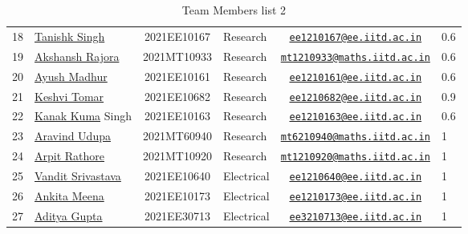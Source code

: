 \documentclass[table]{rapportCS}
\begin{document}
\begin{table}[h]\label{sec:ourtribetwo}
\centering
  \caption{Team Members list 2}
  \begin{tabular}{|p{.3cm}|p{2.9cm}|c|p{2cm}|c|p{.3cm}|}
  \hline
18 & \href{https://www.linkedin.com/in/tanishk-singh-80ba09224/}{Tanishk Singh} & 2021EE10167 & Research & \href{mailto:ee1210167@ee.iitd.ac.in}{\nolinkurl{ee1210167@ee.iitd.ac.in}} & 0.6 \\
        19 & \href{https://www.linkedin.com/in/akshansh-rajora-5794b5228}{Akshansh Rajora} & 2021MT10933 & Research & \href{mailto:mt1210933@maths.iitd.ac.in}{\nolinkurl{mt1210933@maths.iitd.ac.in}} & 0.6 \\
        20 & \href{https://www.linkedin.com/in/ayush-madhur-40a575236/}{ Ayush Madhur}& 2021EE10161 & Research & \href{mailto:ee1210161@ee.iitd.ac.in}{\nolinkurl{ee1210161@ee.iitd.ac.in}} & 0.6 \\
        21 &\href{https://www.linkedin.com/in/keshvi-tomer-4b0331236/}{Keshvi Tomar} & 2021EE10682 & Research & \href{mailto:ee1210682@ee.iitd.ac.in}{\nolinkurl{ee1210682@ee.iitd.ac.in}} & 0.9 \\
        22 & \href{https://www.linkedin.com/in/kanak-kumar-538ab2247/}{Kanak Kuma} Singh} & 2021EE10163 & Research & \href{mailto:ee1210163@ee.iitd.ac.in}{\nolinkurl{ee1210163@ee.iitd.ac.in}} & 0.6 \\
        23 & \href{https://www.linkedin.com/in/aravind-udupa-266a52223/}{Aravind Udupa} & 2021MT60940 & Research & \href{mailto:mt6210940@maths.iitd.ac.in}{\nolinkurl{mt6210940@maths.iitd.ac.in}} & 1 \\
        24 & \href{https://www.linkedin.com/in/arpit-rathore-56b535223/}{Arpit Rathore} & 2021MT10920 & Research & \href{mailto:mt1210920@maths.iitd.ac.in}{\nolinkurl{mt1210920@maths.iitd.ac.in}} & 1 \\
        \hline
        25 & \href{https://www.linkedin.com/in/vandit-srivastava}{Vandit Srivastava} & 2021EE10640 & Electrical & \href{mailto:ee1210640@ee.iitd.ac.in}{\nolinkurl{ee1210640@ee.iitd.ac.in}} & 1 \\
        26 & \href{https://www.linkedin.com/in/ankita-meena-2b919a236/}{Ankita Meena} & 2021EE10173 & Electrical & \href{mailto:ee1210173@ee.iitd.ac.in}{\nolinkurl{ee1210173@ee.iitd.ac.in}} & 1 \\
        27 & \href{https://www.linkedin.com/in/aditya-gupta-178638228}{Aditya Gupta} & 2021EE30713 & Electrical & \href{mailto:ee3210713@ee.iitd.ac.in}{\nolinkurl{ee3210713@ee.iitd.ac.in}} & 1 \\

\end{tabular}
\end{table}
\end{document}

